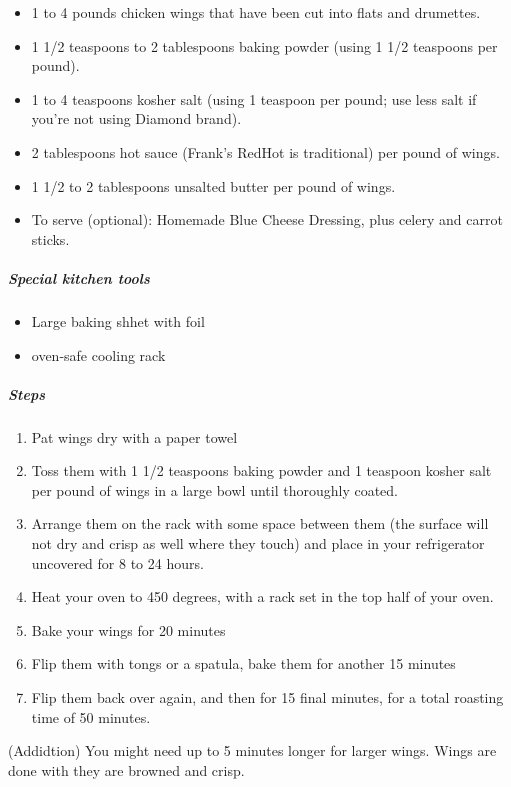 \documentclass[]{article}
\providecommand{\tightlist}{%
  \setlength{\itemsep}{0pt}\setlength{\parskip}{0pt}}
\let\oldsubparagraph\subparagraph
\renewcommand{\subparagraph}[1]{\oldsubparagraph{#1}\mbox{}}
\begin{document}
\begin{itemize}
\tightlist
\item
  1 to 4 pounds chicken wings that have been cut into flats and
  drumettes.
\item
  1 1/2 teaspoons to 2 tablespoons baking powder (using 1 1/2 teaspoons
  per pound).
\item
  1 to 4 teaspoons kosher salt (using 1 teaspoon per pound; use less
  salt if you're not using Diamond brand).
\item
  2 tablespoons hot sauce (Frank's RedHot is traditional) per pound of
  wings.
\item
  1 1/2 to 2 tablespoons unsalted butter per pound of wings.
\item
  To serve (optional): Homemade Blue Cheese Dressing, plus celery and
  carrot sticks.
\end{itemize}

\subparagraph{Special kitchen tools}\label{special-kitchen-tools}

\begin{itemize}
\tightlist
\item
  Large baking shhet with foil
\item
  oven-safe cooling rack
\end{itemize}

\subparagraph{Steps}\label{steps}

\begin{enumerate}
\def\labelenumi{\arabic{enumi}.}
\tightlist
\item
  Pat wings dry with a paper towel
\item
  Toss them with 1 1/2 teaspoons baking powder and 1 teaspoon kosher
  salt per pound of wings in a large bowl until thoroughly coated.
\item
  Arrange them on the rack with some space between them (the surface
  will not dry and crisp as well where they touch) and place in your
  refrigerator uncovered for 8 to 24 hours.
\item
  Heat your oven to 450 degrees, with a rack set in the top half of your
  oven.
\item
  Bake your wings for 20 minutes
\item
  Flip them with tongs or a spatula, bake them for another 15 minutes
\item
  Flip them back over again, and then for 15 final minutes, for a total
  roasting time of 50 minutes.
\end{enumerate}

(Addidtion) You might need up to 5 minutes longer for larger wings.
Wings are done with they are browned and crisp.
\end{document}
